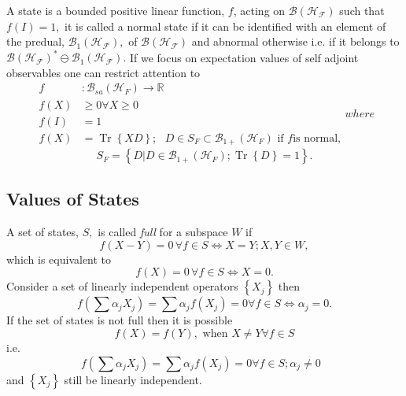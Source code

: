 \documentclass[aps,preprint]{revtex4}%
\begin{document}
A state is a bounded positive linear function, $f$, acting on $\mathcal{B}%
\left(  \mathcal{H}_{\mathcal{F}}\right)  $ such that $f\left(  I\right)  =1,$
it is called a normal state if it can be identified with an element of the
predual, $\mathcal{B}_{1}\left(  \mathcal{H}_{\mathcal{F}}\right)  ,$ of
$\mathcal{B}\left(  \mathcal{H}_{\mathcal{F}}\right)  $ and abnormal otherwise
i.e. if it belongs to $\mathcal{B}\left(  \mathcal{H}_{\mathcal{F}}\right)
^{\ast}\ominus\mathcal{B}_{1}\left(  \mathcal{H}_{\mathcal{F}}\right)  .$ If
we focus on expectation values of self adjoint observables one can restrict
attention to
\begin{subequations}
\label{States}%
\begin{align}
f  &  :\mathcal{B}_{sa}\left(  \mathcal{H}_{F}\right)  \rightarrow
\mathbb{R}\nonumber\\
f\left(  X\right)   &  \geq0\forall X\geq0\nonumber\\
f\left(  I\right)   &  =1\nonumber\\
f\left(  X\right)   &  =\operatorname{Tr}\left\{  XD\right\}  ;\text{ }D\in
S_{F}\subset\mathcal{B}_{1+}\left(  \mathcal{H}_{F}\right)  \text{ if }f\text{
is normal,}%
\end{align}
where
\end{subequations}
\begin{equation}
S_{F}=\left\{  \left.  D\right\vert D\in\mathcal{B}_{1+}\left(  \mathcal{H}%
_{F}\right)  ;\operatorname{Tr}\left\{  D\right\}  =1\right\}  .
\end{equation}


\subsection{Values of States}

A set of states, $S,$ is called \emph{full} for a subspace $W$ if
\begin{equation}
f\left(  X-Y\right)  =0\,\forall f\in S\Leftrightarrow X=Y;X,Y\in W,
\end{equation}
which is equivalent to
\begin{equation}
f\left(  X\right)  =0\,\forall f\in S\Leftrightarrow X=0.
\end{equation}
Consider a set of linearly independent operators $\left\{  X_{j}\right\}  $
then
\begin{equation}
f\left(  \sum\alpha_{j}X_{j}\right)  =\sum\alpha_{j}f\left(  X_{j}\right)
=0\forall f\in S\Leftrightarrow\alpha_{j}=0.
\end{equation}
If the set of states is not full then it is possible
\begin{equation}
f\left(  X\right)  =f\left(  Y\right)  ,\text{ when }X\neq Y\forall f\in S
\end{equation}
i.e.
\begin{equation}
f\left(  \sum\alpha_{j}X_{j}\right)  =\sum\alpha_{j}f\left(  X_{j}\right)
=0\forall f\in S;\alpha_{j}\neq0\text{ }%
\end{equation}
and $\left\{  X_{j}\right\}  $ still be linearly independent.
\end{document}
